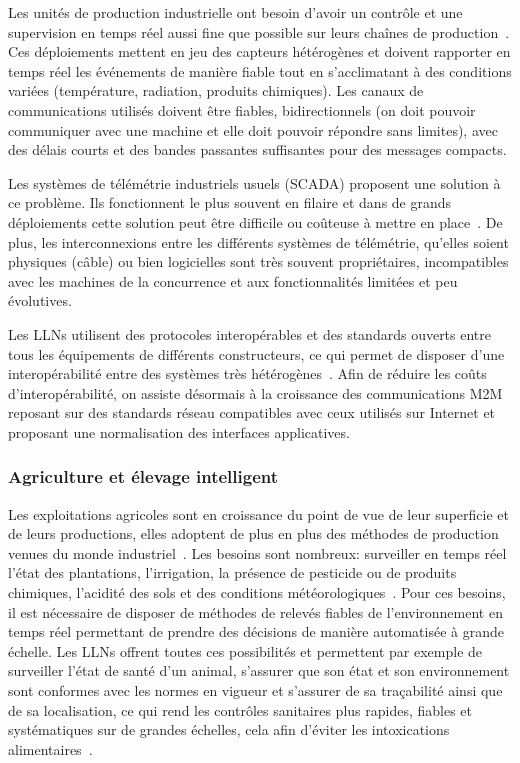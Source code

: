 Les unités de production industrielle ont besoin d'avoir un contrôle et une supervision en temps réel aussi fine que possible sur leurs chaînes de production~\cite{erol2011wireless, gungor2010opportunities}.
Ces déploiements mettent en jeu des capteurs hétérogènes et doivent rapporter en temps réel les événements de manière fiable tout en s'acclimatant à des conditions variées (température, radiation, produits chimiques).
Les canaux de communications utilisés doivent être fiables, bidirectionnels (on doit pouvoir communiquer avec une machine et elle doit pouvoir répondre sans limites), avec des délais courts et des bandes passantes suffisantes pour des messages compacts.

Les systèmes de télémétrie industriels usuels (\ac{SCADA}) proposent une solution à ce problème.
Ils fonctionnent le plus souvent en filaire et dans de grands déploiements cette solution peut être difficile ou coûteuse à mettre en place~\cite{anton2014machine}.
De plus, les interconnexions entre les différents systèmes de télémétrie, qu'elles soient physiques (câble) ou bien logicielles sont très souvent propriétaires, incompatibles avec les machines de la concurrence et aux fonctionnalités limitées et peu évolutives.

Les \ac{LLN}s utilisent des protocoles interopérables et des standards ouverts entre tous les équipements de différents constructeurs, ce qui permet de disposer d'une interopérabilité entre des systèmes très hétérogènes~\cite{shelby20116lowpan, walter2009implementing}.
Afin de réduire les coûts d'interopérabilité, on assiste désormais à la croissance des communications \ac{M2M} reposant sur des standards réseau compatibles avec ceux utilisés sur Internet et proposant une normalisation des interfaces applicatives.

\subsubsection{Agriculture et élevage intelligent}

Les exploitations agricoles sont en croissance du point de vue de leur superficie et de leurs productions, elles adoptent de plus en plus des méthodes de production venues du monde industriel~\cite{ruiz2009review}.
Les besoins sont nombreux: surveiller en temps réel l'état des plantations, l’irrigation, la présence de pesticide ou de produits chimiques, l'acidité des sols et des conditions météorologiques~\cite{wark2007transforming}.
Pour ces besoins, il est nécessaire de disposer de méthodes de relevés fiables de l'environnement en temps réel permettant de prendre des décisions de manière automatisée à grande échelle.
Les \ac{LLN}s offrent toutes ces possibilités et permettent par exemple de surveiller l'état de santé d'un animal, s'assurer que son état et son environnement sont conformes avec les normes en vigueur et s'assurer de sa traçabilité ainsi que de sa localisation, ce qui rend les contrôles sanitaires plus rapides, fiables et systématiques sur de grandes échelles, cela afin d'éviter les intoxications alimentaires~\cite{wang2006wireless}.


